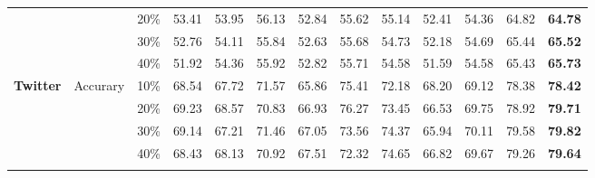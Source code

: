 \documentclass[conference]{IEEEtran}
\theoremstyle{definition}
\begin{document}
\begin{table}[htbp]
\begin{tabular}{|cccccccccc|ccc|}
\multicolumn{1}{|c|}{}                                  & \multicolumn{1}{c|}{}                          & \multicolumn{1}{c|}{20\%} & 53.41        & 53.95        & 56.13        & 52.84                                                          & 55.62           & 55.14        & 52.41             & 54.36           & 64.82           & \textbf{64.78}   \\
\multicolumn{1}{|c|}{}                                  & \multicolumn{1}{c|}{}                          & \multicolumn{1}{c|}{30\%} & 52.76        & 54.11        & 55.84        & 52.63                                                          & 55.68           & 54.73        & 52.18             & 54.69           & 65.44           & \textbf{65.52}   \\
\multicolumn{1}{|c|}{}                                  & \multicolumn{1}{c|}{}                          & \multicolumn{1}{c|}{40\%} & 51.92        & 54.36        & 55.92        & 52.82                                                          & 55.71           & 54.58        & 51.59             & 54.58           & 65.43           & \textbf{65.73}   \\ \midrule\toprule
\multicolumn{1}{|c|}{\multirow{8}{*}{\textbf{Twitter}}} & \multicolumn{1}{c|}{\multirow{4}{*}{Accurary}} & \multicolumn{1}{c|}{10\%} & 68.54        & 67.72        & 71.57        & 65.86                                                          & 75.41           & 72.18        & 68.20             & 69.12           & 78.38           & \textbf{78.42}   \\
\multicolumn{1}{|c|}{}                                  & \multicolumn{1}{c|}{}                          & \multicolumn{1}{c|}{20\%} & 69.23        & 68.57        & 70.83        & 66.93                                                          & 76.27           & 73.45        & 66.53             & 69.75           & 78.92           & \textbf{79.71}   \\
\multicolumn{1}{|c|}{}                                  & \multicolumn{1}{c|}{}                          & \multicolumn{1}{c|}{30\%} & 69.14        & 67.21        & 71.46        & 67.05                                                          & 73.56           & 74.37        & 65.94             & 70.11           & 79.58           & \textbf{79.82}   \\
\multicolumn{1}{|c|}{}                                  & \multicolumn{1}{c|}{}                          & \multicolumn{1}{c|}{40\%} & 68.43        & 68.13        & 70.92        & 67.51                                                          & 72.32           & 74.65        & 66.82             & 69.67           & 79.26           & \textbf{79.64}   \\ \cline{2-13} 

\end{tabular}
\end{table}
\end{document}
